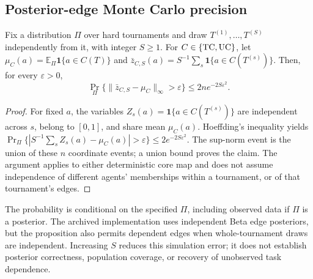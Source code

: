 \subsection{Posterior-edge Monte Carlo precision}
\begin{proposition}\label{prop:posterior-mc}
Fix a distribution $\Pi$ over hard tournaments and draw $T^{(1)},\ldots,T^{(S)}$ independently from it, with integer $S\ge1$. For $C\in\{\mathrm{TC},\mathrm{UC}\}$, let $\mu_C(a)=\mathbb E_\Pi\mathbf1\{a\in C(T)\}$ and $\bar z_{C,S}(a)=S^{-1}\sum_s\mathbf1\{a\in C(T^{(s)})\}$. Then, for every $\varepsilon>0$,
\[
\Pr_\Pi\{\|\bar z_{C,S}-\mu_C\|_\infty>\varepsilon\}
\le2n e^{-2S\varepsilon^2}.
\]
\end{proposition}
\begin{proof}
For fixed $a$, the variables $Z_s(a)=\mathbf1\{a\in C(T^{(s)})\}$ are independent across $s$, belong to $[0,1]$, and share mean $\mu_C(a)$. Hoeffding's inequality yields
$\Pr_\Pi\{|S^{-1}\sum_sZ_s(a)-\mu_C(a)|>\varepsilon\}\le2e^{-2S\varepsilon^2}$.
The sup-norm event is the union of these $n$ coordinate events; a union bound proves the claim. The argument applies to either deterministic core map and does not assume independence of different agents' memberships within a tournament, or of that tournament's edges.
\end{proof}
The probability is conditional on the specified $\Pi$, including observed data if $\Pi$ is a posterior. The archived implementation uses independent Beta edge posteriors, but the proposition also permits dependent edges when whole-tournament draws are independent. Increasing $S$ reduces this simulation error; it does not establish posterior correctness, population coverage, or recovery of unobserved task dependence.

